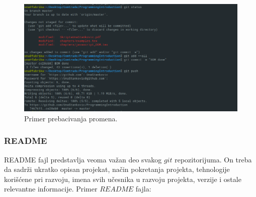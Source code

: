 \begin{figure}[h!]
\begin{center}
\includegraphics[scale=0.5]{pictures/git.png}
\end{center}
\caption{Primer prebacivanja promena.}
\label{fig:storage}
\end{figure}

\subsubsection{README}
README fajl predstavlja veoma važan deo svakog $git$ repozitorijuma. On treba da sadrži ukratko opisan projekat, način pokretanja projekta, tehnologije korišćene pri razvoju, imena svih učesnika u razvoju projekta, verzije i ostale relevantne informacije. Primer $README$ fajla:

